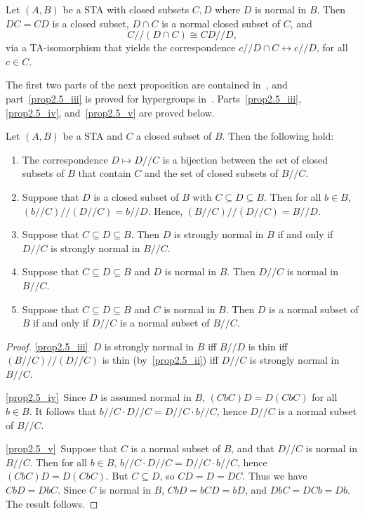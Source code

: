 \documentclass[ALCO,ThmDefs,Unicode,epreuves]{cedram}
\begin{document}
\begin{lemm}
\label{lem:isom}
Let $(A, B)$ be a STA with closed subsets $C, D$ where $D$ is normal in
$B$. Then $DC = CD$ is a closed subset, $D\cap C$ is a normal closed
subset of $C$, and
\[
C//(D\cap C) \cong CD//D,
\] 
via a TA-isomorphism that yields the correspondence $c//D\cap C
\leftrightarrow c//D$, for all $c \in C$.
\end{lemm}


The first two parts of the next proposition are contained in~\cite
[Proposition 2.13]{BZ}, and part~\ref{prop2.5_iii} is proved for hypergroups in~\cite
[Lemma 4.6]{FZ}. Parts~\ref{prop2.5_iii}, \ref{prop2.5_iv}, and~\ref{prop2.5_v} are proved below.

\begin{prop}
\label{prop:subset_corresp}
Let $(A, B)$ be a STA and $C$ a closed subset of $B$. Then the
following hold:
\begin{enumerate}[label = \textup{(}\roman*\textup{)}] 
\item\label{prop2.5_i} The correspondence $D \mapsto D//C$ is a bijection between the set of
closed subsets of $B$ that contain $C$ and the set of closed subsets of
$B//C$.
\item\label{prop2.5_ii} Suppose that $D$ is a closed subset of $B$ with $C \subseteq D \subseteq
B$. Then for all $b \in B$, $(b//C)//(D//C) = b//D$. Hence,
$(B//C)//(D//C) = B//D$.
\item\label{prop2.5_iii} Suppose that $C \subseteq D \subseteq B$. Then $D$ is strongly normal
in $B$ if and only if $D//C$ is strongly normal in $B//C$.
\item\label{prop2.5_iv} Suppose that $C \subseteq D \subseteq B$ and $D$ is normal in $B$. Then
$D//C$ is normal in $B//C$.
\item\label{prop2.5_v} Suppose that $C \subseteq D \subseteq B$ and $C$ is normal in $B$. Then
$D$ is a normal subset of $B$ if and only if $D//C$ is a normal subset
of $B//C$.
\end{enumerate}
\end{prop}

\begin{proof}
\ref{prop2.5_iii}~$D$ is strongly normal in $B$ iff $B//D$ is thin iff
$(B//C)//(D//C)$ is thin (by~\ref{prop2.5_ii}) iff $D//C$ is strongly normal in
$B//C$. 
 
\ref{prop2.5_iv}~Since $D$ is assumed normal in $B$, $(CbC)D = D(CbC)$ for all $b \in
B$. It follows that $b//C\cdot D//C = D//C\cdot b//C$, hence $D//C$ is
a normal subset of $B//C$.
 
\ref{prop2.5_v}~Suppose that $C$ is a normal subset of $B$, and that $D//C$ is
normal in $B//C$. Then for all $b \in B$, $b//C\cdot D//C = D//C\cdot
b//C$, hence $(CbC)D = D(CbC)$. But $C \subseteq D$, so $CD = D = DC$.
Thus we have $CbD = DbC$. Since $C$ is normal in $B$, $CbD = bCD = bD$,
and $DbC = DCb = Db$. The result follows.
\end{proof}
\end{document}
